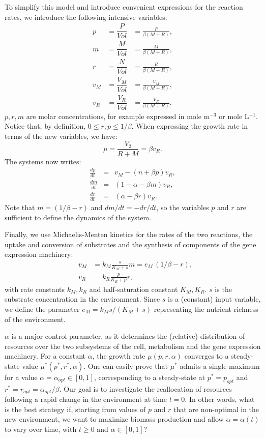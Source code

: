 \documentclass[a4paper, 10pt, conference]{ieeeconf}      %
\begin{document}
To simplify this model and introduce convenient expressions for the reaction rates, we introduce the following intensive variables:
\begin{eqnarray*}
p &= \dfrac{P}{\mathit{Vol}} &= \frac{P}{\beta (M+R)}, \\
m &= \dfrac{M}{\mathit{Vol}} &= \frac{M}{\beta (M+R)},\\
r &= \dfrac{N}{\mathit{Vol}} &= \frac{R}{\beta (M+R)},\\
v_M &= \dfrac{V_M}{\mathit{Vol}} &= \frac{V_M}{\beta (M+R)},\\
v_R &= \dfrac{V_R}{\mathit{Vol}} &= \frac{V_R}{\beta (M+R)}.
\end{eqnarray*}
$p,r,m$ are molar concentrations, for example expressed in mole m$^{-3}$ or mole L$^{-1}$. Notice that, by definition, $0 \leq r, p \leq 1/\beta$. When expressing the growth rate in terms of the new variables, we have:
\[
\mu = \frac{V_2}{R+M} = \beta v_R.
\]
The systems now writes:
\begin{eqnarray}
\frac{dp}{dt} &=& v_M - (n + \beta p) v_R, \label{eq:p} \\
\frac{dm}{dt} &=& (1-\alpha - \beta m) v_R, \label{eq:m} \\ 
\frac{dr}{dt} &=& (\alpha - \beta r) v_R. \label{eq:r}
\end{eqnarray}
Note that $m = (1/\beta - r)$ and $dm/dt = - dr/dt$, so the variables $p$ and $r$ are sufficient to define the dynamics of the system.

Finally, we use Michaelis-Menten kinetics for the rates of the two reactions, the uptake and conversion of substrates and the synthesis of components of the gene expression machinery:
\begin{eqnarray}
&v_M &= k_M \frac{s}{K_M +s} m = e_M \, (1/\beta -r), \\
&v_R &= k_R \frac{p}{K_R + p} r,
\end{eqnarray}
with rate constants $k_M, k_R$ and half-saturation constant $K_M, K_R$.
$s$ is the substrate concentration in the environment.
Since $s$ is a (constant) input variable, we define the parameter $e_M = k_M s / (K_M + s)$ representing the nutrient richness of the environment.

$\alpha$ is a major control parameter, as it determines the (relative) distribution of resources over the two subsystems of the cell, metabolism and the gene expression machinery.
For a constant $\alpha$, the growth rate $\mu(p,r,\alpha)$ converges to a steady-state value $\mu^*(p^*, r^*, \alpha)$. 
One can easily prove that $\mu^*$ admits a single maximum for a value $\alpha = \alpha_{opt} \in [0,1]$, corresponding to a steady-state at $p^* = p_{opt}$ and $r^* = r_{opt} = \alpha_{opt}/ \beta$.
Our goal is to investigate the reallocation of resources following a rapid change in the environment at time $t=0$.
In other words, what is the best strategy if, starting from values of $p$ and $r$ that are non-optimal in the new environment, we want to maximize biomass production and allow $\alpha = \alpha(t)$ to vary over time, with $t\geq 0$ and $\alpha \in [0, 1]$?
\end{document}
